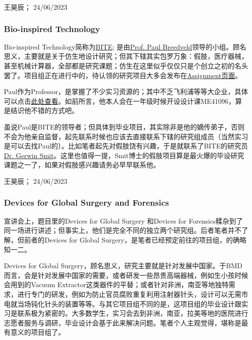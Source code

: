 \begin{flushright}
王昊辰； 24/06/2023
\end{flushright}

\subsubsection{Bio-inspired Technology}
Bio-inspired Technology简称为\href{https://www.bitegroup.nl/}{\uline{BITE}}; 是由\href{https://www.linkedin.com/in/paul-breedveld-b0212b8a?originalSubdomain=nl}{\uline{Prof. Paul Breedveld}}领导的小组。顾名思义，主要就是关于仿生地设计研究；但其下辖其实包罗万象：假肢，医疗器械，甚至机械计算器，全部都是研究课题；仿生在这里似乎仅仅只是个创立之初的名头罢了。项目组正在进行中的，待认领的研究项目大多会发布在\href{https://www.bitegroup.nl/assignments/}{\uline{Assignment页面}}。 

Paul作为Professor，是掌握了不少实习资源的；其中不乏飞利浦等等大企业，具体可以点击\href{https://www.bitegroup.nl/internships/}{\uline{此处查看}}。如前所言，他本人会在一年级时候开设设计课ME41096，算是结识他不错的方式吧。

虽说Paul是BITE的领导者；但具体到毕业项目，其实除非是他的嫡传弟子，否则不会为他亲自监督，起先联系时候也应该去直接联系下辖的研究组成员（当然实习是可以去找Paul的）。比如笔者起先对假肢饶有兴趣，于是就联系了BITE的研究员\href{https://www.bitegroup.nl/people/gerwin-smit/}{Dr. Gerwin Smit}。这里也值得一提，Smit博士的假肢项目算是最火爆的毕设研究课题之一了，如果对假肢感兴趣请务必早早联系他。
\begin{flushright}
王昊辰； 24/06/2023
\end{flushright}

\subsubsection{Devices for Global Surgery and Forensics}
宣讲会上，题目里的Devices for Global Surgery 和Devices for Forensics糅杂到了同一场进行讲述；但事实上，他们是完全不同的独立两个研究组。后者笔者并不了解，但前者的Devices for Global Surgery，是笔者已经预定前往的项目组，的确略知一二。

Devices for Global Surgery，顾名思义，研究主要就是针对发展中国家。于BMD而言，会是针对发展中国家的需要，或者研发一些昂贵高端器械，例如生小孩时候会用到的Vacuum Extractor这类器件的平替；或者针对非洲，南亚等地独特需求，进行专门的研发，例如为防止官员腐败重复利用注射器针头，设计可以无需市电就当场钝化针头的装置等等。与其它项目组不同的是，这项目组的毕业设计跟实习是联系极为紧密的。大多数学生，实习会去到非洲，南亚，拉美等地的医院进行志愿者服务与调研，毕业设计会基于此来解决问题。笔者个人主观觉得，堪称是最有意义的项目组了。

